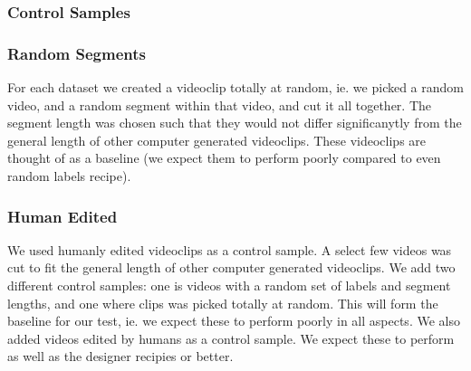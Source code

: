 \subsubsection{Control Samples}
%
%
\subsubsection{Random Segments}
% 
For each dataset we created a videoclip totally at random, ie. we picked a random video, and a random segment within that video, and cut it all together. The segment length was chosen such that they would not differ significanytly from the general length of other computer generated videoclips. These videoclips are thought of as a baseline (we expect them to perform poorly compared to even random labels recipe).
%
\subsubsection{Human Edited}
% 
We used humanly edited videoclips as a control sample. A select few videos was cut to fit the general length of other computer generated videoclips.
%
%
We add two different control samples: one is videos with a random set of labels and segment lengths, and one where clips was picked totally at random.
%
%
This will form the baseline for our test, ie. we expect these to perform poorly in all aspects. We also added videos edited by humans as a control sample. We expect these to perform as well as the designer recipies or better.
%
